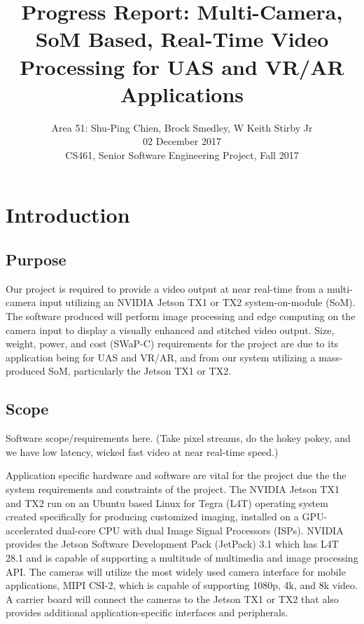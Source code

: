 \documentclass[letterpaper,10pt,serif,draftclsnofoot,onecolumn,compsoc,titlepage]{IEEEtran}
\title{Progress Report: Multi-Camera, SoM Based, Real-Time Video Processing for UAS and VR/AR Applications}
\author{Area 51: Shu-Ping Chien, Brock Smedley, W Keith Stirby Jr \\ 02 December 2017 \\ CS461, Senior Software Engineering Project, Fall 2017}
\begin{document}
\begin{titlepage}
\maketitle

\begin{abstract}


\thispagestyle{empty}
\end{abstract}
\end{titlepage}

\newpage
\tableofcontents

\newpage

\section{Introduction}

\subsection{Purpose}

Our project is required to provide a video output at near real-time from a 
multi-camera input utilizing an NVIDIA Jetson TX1 or TX2 system-on-module (SoM). 
The software produced will perform image processing and edge computing on the 
camera input to display a visually enhanced and stitched video output. 
Size, weight, power, and cost (SWaP-C) requirements for the project are due 
to its application being for UAS and VR/AR, and from our system utilizing a 
mass-produced SoM, particularly the Jetson TX1 or TX2.  

\subsection{Scope}
 
Software scope/requirements here. (Take pixel streams, do the hokey pokey, and 
we have low latency, wicked fast video at near real-time speed.)
 
Application specific hardware and software are vital for the project due the the 
system requirements and constraints of the project.
The NVIDIA Jetson TX1 and TX2 run on an Ubuntu based Linux for Tegra (L4T) operating 
system created specifically for producing customized imaging, installed on a 
GPU-accelerated dual-core CPU with dual Image Signal Processors (ISPs). 
NVIDIA provides the Jetson Software Development Pack (JetPack) 3.1 which has L4T 28.1 
and is capable of supporting a multitude of multimedia and image processing API. 
The cameras will utilize the most widely used camera interface for mobile applications, 
MIPI CSI-2, which is capable of supporting 1080p, 4k, and 8k video. 
A carrier board will connect the cameras to the Jetson TX1 or TX2 that also provides 
additional application-specific interfaces and peripherals. 
\end{document}
